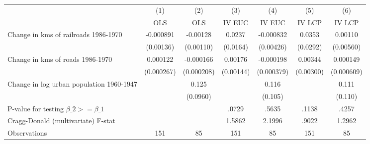 {
\def\sym#1{\ifmmode^{#1}\else\(^{#1}\)\fi}
\begin{tabular}{l*{6}{c}}
\hline\hline
                &\multicolumn{1}{c}{(1)}&\multicolumn{1}{c}{(2)}&\multicolumn{1}{c}{(3)}&\multicolumn{1}{c}{(4)}&\multicolumn{1}{c}{(5)}&\multicolumn{1}{c}{(6)}\\
                &\multicolumn{1}{c}{OLS}&\multicolumn{1}{c}{OLS}&\multicolumn{1}{c}{IV EUC}&\multicolumn{1}{c}{IV EUC}&\multicolumn{1}{c}{IV LCP}&\multicolumn{1}{c}{IV LCP}\\
\hline
Change in kms of railroads 1986-1970&-0.000891         & -0.00128         &   0.0237         &-0.000832         &   0.0353         &  0.00110         \\
                &(0.00136)         &(0.00110)         & (0.0164)         &(0.00426)         & (0.0292)         &(0.00560)         \\
[1em]
Change in kms of roads 1986-1970& 0.000122         &-0.000166         &  0.00176         &-0.000198         &  0.00344         & 0.000149         \\
                &(0.000267)         &(0.000208)         &(0.00144)         &(0.000379)         &(0.00300)         &(0.000609)         \\
[1em]
Change in log urban population 1960-1947&                  &    0.125         &                  &    0.116         &                  &    0.111         \\
                &                  & (0.0960)         &                  &  (0.105)         &                  &  (0.110)         \\
\hline
P-value for testing $\beta\_{2} >= \beta\_{1}$&                  &                  &    .0729         &    .5635         &    .1138         &    .4257         \\
Cragg-Donald (multivariate) F-stat&                  &                  &   1.5862         &   2.1996         &    .9022         &   1.2962         \\
Observations    &      151         &       85         &      151         &       85         &      151         &       85         \\
\hline\hline
\end{tabular}
}
